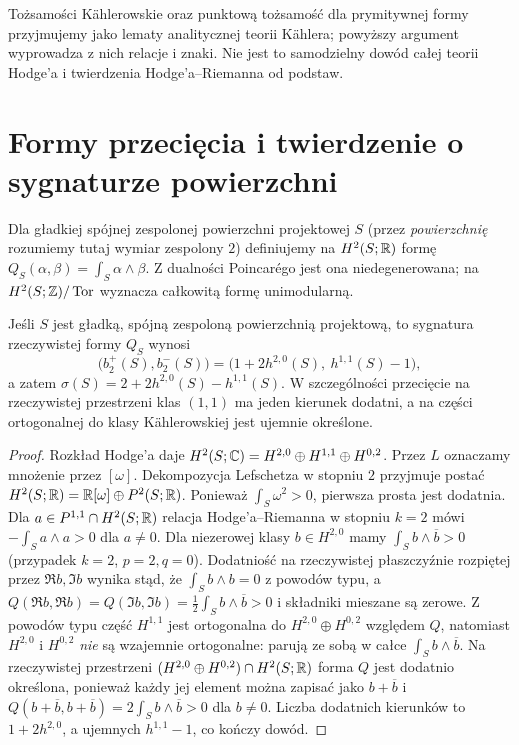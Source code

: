 \begin{uwaga}
Tożsamości Kählerowskie oraz punktową tożsamość dla
prymitywnej formy przyjmujemy jako lematy analitycznej
teorii Kählera; powyższy argument wyprowadza z nich
relacje i znaki. Nie jest to samodzielny dowód całej
teorii Hodge'a i twierdzenia Hodge'a--Riemanna od podstaw.
\end{uwaga}

\section{Formy przecięcia i twierdzenie o sygnaturze powierzchni}
\begin{definicja}
Dla gładkiej spójnej zespolonej powierzchni projektowej $S$
(przez \emph{powierzchnię} rozumiemy tutaj wymiar zespolony $2$)
definiujemy na $H^2(S;\mathbb{R})$ formę
$Q_S(\alpha,\beta)=\int_S\alpha\wedge\beta$.
Z dualności Poincarégo jest ona niedegenerowana;
na $H^2(S;\mathbb{Z})/\operatorname{Tor}$ wyznacza całkowitą
formę unimodularną.
\end{definicja}
\begin{twierdzenie}
\label{thm:xvii-hodge-index}
Jeśli $S$ jest gładką, spójną zespoloną powierzchnią projektową,
to sygnatura rzeczywistej formy $Q_S$ wynosi
\[
\bigl(b_2^+(S),b_2^-(S)\bigr)
=\bigl(1+2h^{2,0}(S),\ h^{1,1}(S)-1\bigr),
\]
a zatem $\sigma(S)=2+2h^{2,0}(S)-h^{1,1}(S)$.
W szczególności przecięcie na rzeczywistej przestrzeni
klas $(1,1)$ ma jeden kierunek dodatni, a na części
ortogonalnej do klasy Kählerowskiej jest ujemnie określone.
\end{twierdzenie}
\begin{proof}
Rozkład Hodge'a daje
$H^2(S;\mathbb{C})=H^{2,0}\oplus H^{1,1}\oplus H^{0,2}$.
Przez $L$ oznaczamy mnożenie przez $[\omega]$.
Dekompozycja Lefschetza w stopniu $2$ przyjmuje postać
$H^2(S;\mathbb{R})=\mathbb{R}[\omega]\oplus P^2(S;\mathbb{R})$.
Ponieważ $\int_S\omega^2>0$, pierwsza prosta jest dodatnia.
Dla $a\in P^{1,1}\cap H^2(S;\mathbb{R})$ relacja
Hodge'a--Riemanna w stopniu $k=2$ mówi
$-\int_S a\wedge a>0$ dla $a\ne0$.
Dla niezerowej klasy $b\in H^{2,0}$ mamy
$\int_S b\wedge\overline b>0$ (przypadek $k=2$, $p=2,q=0$).
Dodatniość na rzeczywistej płaszczyźnie
rozpiętej przez $\Re b,\Im b$ wynika stąd, że
$\int_S b\wedge b=0$ z powodów typu, a
$Q(\Re b,\Re b)=Q(\Im b,\Im b)
=\frac12\int_S b\wedge\overline b>0$ i składniki
mieszane są zerowe. Z powodów typu część $H^{1,1}$ jest ortogonalna do
$H^{2,0}\oplus H^{0,2}$ względem $Q$, natomiast
$H^{2,0}$ i $H^{0,2}$ \emph{nie} są wzajemnie ortogonalne:
parują ze sobą w całce $\int_S b\wedge\overline b$.
Na rzeczywistej przestrzeni $(H^{2,0}\oplus H^{0,2})\cap
H^2(S;\mathbb{R})$ forma $Q$ jest dodatnio określona,
ponieważ każdy jej element można zapisać jako $b+\overline b$
i $Q(b+\overline b,b+\overline b)=2\int_S b\wedge\overline b>0$
dla $b\ne0$.
Liczba dodatnich kierunków to $1+2h^{2,0}$,
a ujemnych $h^{1,1}-1$, co kończy dowód.
\end{proof}
